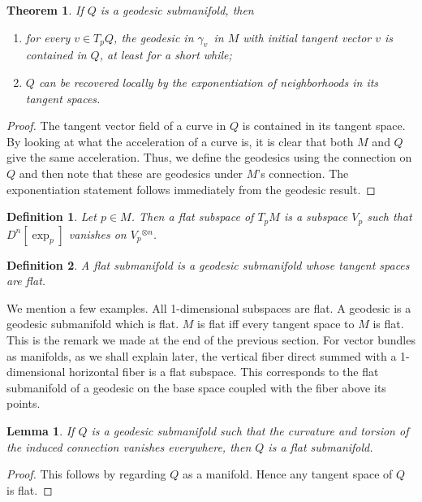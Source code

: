 \documentclass[11pt]{article}
\newtheorem{theorem}{Theorem}
\newtheorem{lemma}{Lemma}
\newtheorem{defn}{Definition}
\theoremstyle{remark}
\begin{document}
\begin{theorem}
If $Q$ is a geodesic submanifold, then 
\begin{enumerate}
\item for every $v \in T_pQ$, the geodesic in \ensuremath{\gamma_v}\ in $M$ with
initial tangent vector $v$ is contained in $Q$,
at least for a short while; 
\item $Q$ can be recovered locally by the exponentiation of
neighborhoods in its
tangent spaces. 
\end{enumerate}
\end{theorem}

\begin{proof}
The tangent vector field of a curve in $Q$ is contained in its tangent
space. By looking at what the acceleration of a curve is, it is clear
that both $M$ and $Q$ give the same acceleration. Thus, we define the
geodesics using the connection on $Q$ and then note that
these are geodesics under $M$'s connection. 
The exponentiation statement
follows immediately from the geodesic result. 
\end{proof}


\begin{defn}
Let $p \in M$. 
Then a \emph{flat subspace of \ensuremath{T_p M}} is  a subspace $V_p$ such that  
$\ensuremath{D^{n} [{\ensuremath{\exp_{p}{}}}] {} }$ vanishes on $V_p\ensuremath{^{\otimes n} }$.  
\end{defn}


\begin{defn}
A \emph{flat submanifold} is a geodesic submanifold whose tangent spaces are
flat.  
\end{defn}

We mention a few examples.
All 1-dimensional subspaces are flat. A geodesic is a geodesic
submanifold which is flat. 
 $M$ is flat iff every tangent space to $M$ is flat. This is the remark we made
at the end of the previous section. For vector bundles as manifolds, 
as we shall
explain later, the vertical fiber direct summed with a 1-dimensional
horizontal fiber is a flat subspace. This corresponds to the flat
submanifold of a geodesic on the base space coupled with the fiber
above its points. 


\begin{lemma}
If $Q$ is a geodesic submanifold such that the curvature
and torsion 
of the induced connection vanishes everywhere, then $Q$ is a flat
submanifold.
\end{lemma}

\begin{proof}
This follows by regarding $Q$ as a manifold. Hence any tangent space
of $Q$ is flat. 
\end{proof}
\end{document}
